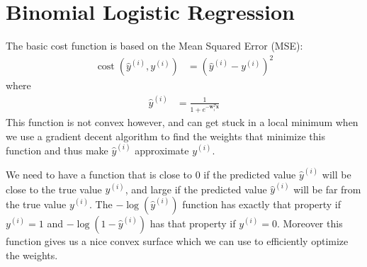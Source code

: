 \documentclass[a4paper]{article}
\begin{document}




\section{Binomial Logistic Regression}

The basic cost function is based on the Mean Squared Error (MSE):
\begin{align}
\operatorname{cost}(\hat{y}^{(i)},y^{(i)}) &= (\hat{y}^{(i)} - y^{(i)})^2
\end{align}
where
\begin{align}
\hat{y}^{(i)} &= \frac{1}{1 + e^{-\mathbf{w}^T_i\mathbf{x}}}
\end{align}
This function is not convex however, and can get stuck in a local minimum when we use a gradient decent algorithm to find the weights that minimize this function and thus make $\hat{y}^{(i)}$ approximate $y^{(i)}$.

We need to have a function that is close to $0$ if the predicted value $\hat{y}^{(i)}$ will be close to the true value $y^{(i)}$, and large if the predicted value $\hat{y}^{(i)}$ will be far from the true value $y^{(i)}$. The $-\log(\hat{y}^{(i)})$ function has exactly that property if $y^{(i)}=1$ and $-\log(1-\hat{y}^{(i)})$ has that property if $y^{(i)}=0$. Moreover this function gives us a nice convex surface which we can use to efficiently optimize the weights.
\end{document}
